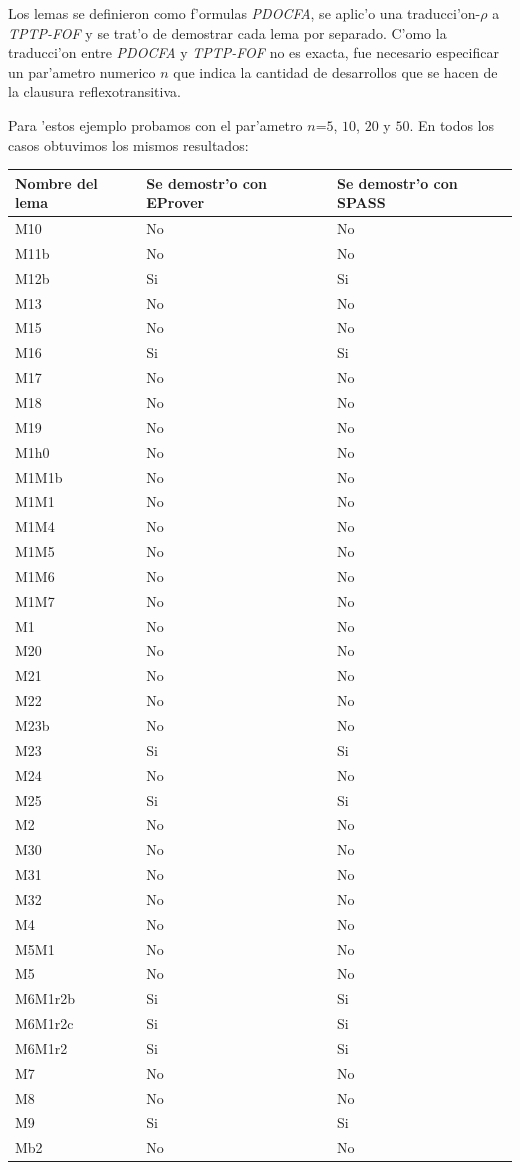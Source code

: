 Los lemas se definieron como f'ormulas \textit{PDOCFA}, se aplic'o una traducci'on-$\rho$ a \textit{TPTP-FOF} y se trat'o de demostrar cada lema por separado. C'omo la traducci'on entre \textit{PDOCFA} y \textit{TPTP-FOF} no es exacta, fue necesario especificar un par'ametro numerico $n$ que indica la cantidad de desarrollos que se hacen de la clausura reflexotransitiva.

Para 'estos ejemplo probamos con el par'ametro $n$=$5$, $10$, $20$ y $50$. En todos los casos obtuvimos los mismos resultados:

\vspace{1em}

\begin{tabular}{| l | l | l |}
\hline
  Nombre del lema & Se demostr'o con EProver & Se demostr'o con SPASS  \\\hline
  
M10 & No & No \\
M11b & No & No \\
M12b & Si & Si \\
M13 & No & No \\
M15 & No & No \\
M16 & Si & Si \\
M17 & No & No \\
M18 & No & No \\
M19 & No & No \\
M1h0 & No & No \\
M1M1b & No & No \\
M1M1 & No & No \\
M1M4 & No & No \\
M1M5 & No & No \\
M1M6 & No & No \\
M1M7 & No & No \\
M1 & No & No \\
M20 & No & No \\
M21 & No & No \\
M22 & No & No \\
M23b & No & No \\
M23 & Si & Si \\
M24 & No & No \\
M25 & Si & Si \\
M2 & No & No \\
M30 & No & No \\
M31 & No & No \\
M32 & No & No \\
M4 & No & No \\
M5M1 & No & No \\
M5 & No & No \\
M6M1r2b & Si & Si \\
M6M1r2c & Si & Si \\
M6M1r2 & Si & Si \\
M7 & No & No \\
M8 & No & No \\
M9 & Si & Si \\
Mb2 & No & No \\

\hline
\end{tabular}

